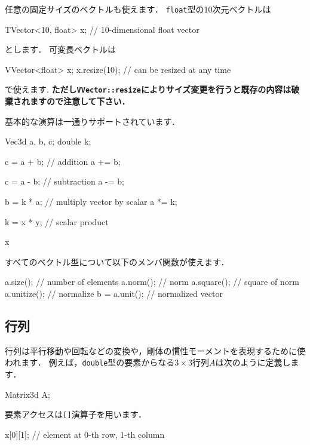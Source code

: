 \KLUDGE 任意の固定サイズのベクトルも使えます．
\texttt{float}\KLUDGE 型の10\KLUDGE 次元ベクトルは
\begin{sourcecode}
TVector<10, float> x;    // 10-dimensional float vector
\end{sourcecode}
\KLUDGE とします．
\KLUDGE 可変長ベクトルは
\begin{sourcecode}
VVector<float> x;
x.resize(10);            // can be resized at any time
\end{sourcecode}
\KLUDGE で使えます.
\textbf{\KLUDGE ただし\texttt{VVector::resize}\KLUDGE によりサイズ変更を行うと既存の内容は破棄されますので注意して下さい．}

\KLUDGE 基本的な演算は一通りサポートされています．
\begin{sourcecode}
Vec3d a, b, c;
double k;

c = a + b;               // addition
a += b;

c = a - b;               // subtraction
a -= b;

b = k * a;               // multiply vector by scalar
a *= k;

k = x * y;               // scalar product

x %
\end{sourcecode}

\KLUDGE すべてのベクトル型について以下のメンバ関数が使えます．
\begin{sourcecode}
a.size();                // number of elements
a.norm();                // norm
a.square();              // square of norm
a.unitize();             // normalize
b = a.unit();            // normalized vector
\end{sourcecode}


\subsection*{\KLUDGE 行列}


\KLUDGE 行列は平行移動や回転などの変換や，剛体の慣性モーメントを表現するために使われます．
\KLUDGE 例えば，\texttt{double}\KLUDGE 型の要素からなる$3 \times 3$\KLUDGE 行列$A$\KLUDGE は次のように定義します．
\begin{sourcecode}
Matrix3d A;
\end{sourcecode}

\KLUDGE 要素アクセスは\texttt{[]}\KLUDGE 演算子を用います．
\begin{sourcecode}
x[0][1];    // element at 0-th row, 1-th column
\end{sourcecode}

